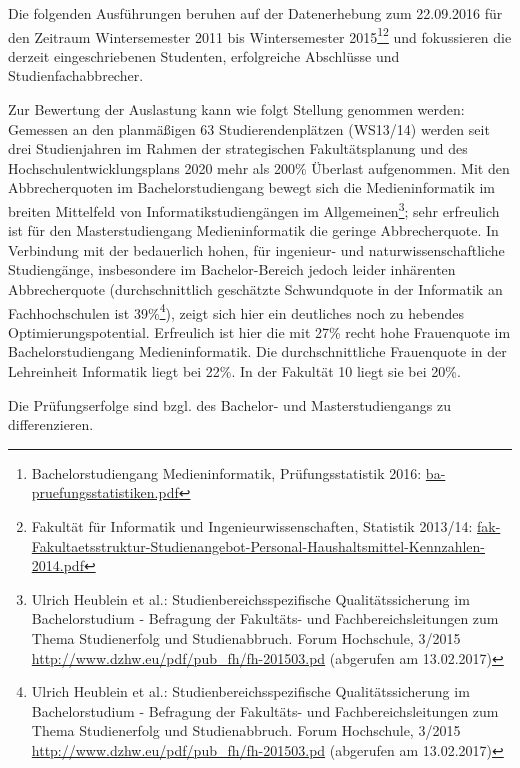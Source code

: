 Die folgenden Ausführungen beruhen auf der Datenerhebung zum 22.09.2016
für den Zeitraum Wintersemester 2011 bis Wintersemester 2015\footnote{Bachelorstudiengang
  Medieninformatik, Prüfungsstatistik 2016:
  \href{https://th-koeln.github.io/mi-2017/anhaenge/ba-pruefungsstatistiken.pdf}{ba-pruefungsstatistiken.pdf}}\footnote{Fakultät
  für Informatik und Ingenieurwissenschaften, Statistik 2013/14:
  \href{https://th-koeln.github.io/mi-2017/anhaenge/fak-Fakultaetsstruktur-Studienangebot-Personal-Haushaltsmittel-Kennzahlen-2014.pdf}{fak-Fakultaetsstruktur-Studienangebot-Personal-Haushaltsmittel-Kennzahlen-2014.pdf}}
und fokussieren die derzeit eingeschriebenen Studenten, erfolgreiche
Abschlüsse und Studienfachabbrecher.

Zur Bewertung der Auslastung kann wie folgt Stellung genommen werden:
Gemessen an den planmäßigen 63 Studierendenplätzen (WS13/14) werden seit
drei Studienjahren im Rahmen der strategischen Fakultätsplanung und des
Hochschulentwicklungsplans 2020 mehr als 200\% Überlast aufgenommen. Mit
den Abbrecherquoten im Bachelorstudiengang bewegt sich die
Medieninformatik im breiten Mittelfeld von Informatikstudiengängen im
Allgemeinen\footnote{Ulrich Heublein et al.: Studienbereichsspezifische
  Qualitätssicherung im Bachelorstudium - Befragung der Fakultäts- und
  Fachbereichsleitungen zum Thema Studienerfolg und Studienabbruch.
  Forum Hochschule, 3/2015
  \href{http://www.dzhw.eu/pdf/pub_fh/fh-201503.pdf}{http://www.dzhw.eu/pdf/pub\_fh/fh-201503.pd}
  (abgerufen am 13.02.2017)}; sehr erfreulich ist für den
Masterstudiengang Medieninformatik die geringe Abbrecherquote. In
Verbindung mit der bedauerlich hohen, für ingenieur- und
naturwissenschaftliche Studiengänge, insbesondere im Bachelor-Bereich
jedoch leider inhärenten Abbrecherquote (durchschnittlich geschätzte
Schwundquote in der Informatik an Fachhochschulen ist 39\%\footnote{Ulrich
  Heublein et al.: Studienbereichsspezifische Qualitätssicherung im
  Bachelorstudium - Befragung der Fakultäts- und Fachbereichsleitungen
  zum Thema Studienerfolg und Studienabbruch. Forum Hochschule, 3/2015
  \href{http://www.dzhw.eu/pdf/pub_fh/fh-201503.pdf}{http://www.dzhw.eu/pdf/pub\_fh/fh-201503.pd}
  (abgerufen am 13.02.2017)}), zeigt sich hier ein deutliches noch zu
hebendes Optimierungspotential. Erfreulich ist hier die mit 27\% recht
hohe Frauenquote im Bachelorstudiengang Medieninformatik. Die
durchschnittliche Frauenquote in der Lehreinheit Informatik liegt bei
22\%. In der Fakultät 10 liegt sie bei 20\%.

Die Prüfungserfolge sind bzgl. des Bachelor- und Masterstudiengangs zu
differenzieren.

